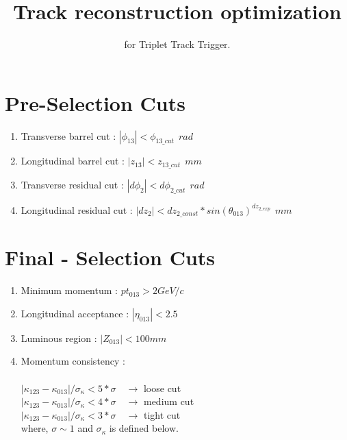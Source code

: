 \documentclass[11pt,a4paper]{article}
\title{Track reconstruction optimization}
\author{for Triplet Track Trigger.}
\date{}
\begin{document}
\maketitle

\section*{Pre-Selection Cuts}

\begin{enumerate}\item Transverse barrel cut : $|\phi_{13}| < \phi_{13 \_ cut}  \: \: rad $ 

\item Longitudinal barrel cut  : $|z_{13}| < z_{13 \_ cut}  \: \: mm$ 
\item Transverse residual cut : $|d\phi_{2}| < d\phi_{2 \_ cut}  \: \: rad$
\item Longitudinal residual cut : $|dz_{2}| <  dz_{2 \_const}* sin(\theta_{013})^{dz_{2 \_exp}} \: \: mm$
\end{enumerate}
\section*{Final - Selection Cuts}
\begin{enumerate}
\item Minimum momentum : $ pt_{013} > 2 GeV/c$\
\item Longitudinal acceptance : $|\eta_{013}| < 2.5$
\item Luminous region : $|Z_{013}| < 100mm$
\item Momentum consistency : \\\\
$|\kappa_{123} - \kappa_{013}| / \sigma_{\kappa} < 5*\sigma \quad \rightarrow$ loose cut \\
$|\kappa_{123} - \kappa_{013}| / \sigma_{\kappa} < 4*\sigma \quad \rightarrow $ medium cut \\
$|\kappa_{123} - \kappa_{013}| / \sigma_{\kappa} < 3*\sigma \quad \rightarrow$ tight cut \\
where, $\sigma \sim 1 $ and $\sigma_{\kappa}$ is defined below.
\end{enumerate}
\end{document}
